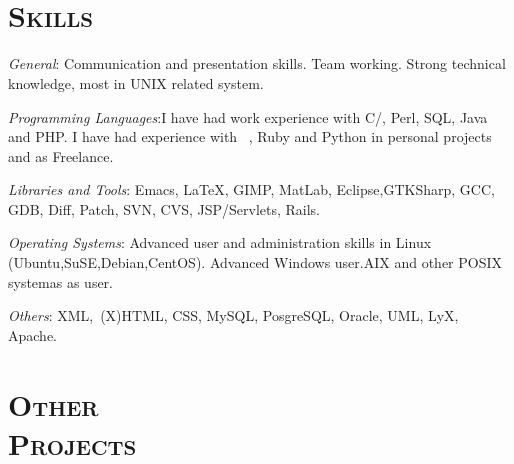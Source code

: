 \begin{resume}
 \begin{formatb}
   \\
   \body\\
 \end{formatb}



\section{\textsc{Skills}}

\emph{General}: Communication and presentation skills. Team
working. Strong technical knowledge, most in UNIX related system.

\emph{Programming Languages}:I have had work experience with
 C/\Cplusplus, Perl, SQL, Java and PHP. I have had experience with \
 \CSharp, Ruby and Python in personal projects and as Freelance.

\emph{Libraries and Tools}: Emacs, \LaTeX, GIMP, MatLab, Eclipse,GTKSharp, GCC, GDB, Diff, Patch, SVN, CVS, JSP/Servlets, Rails.

\emph{Operating Systems}: Advanced user and administration skills in
Linux (Ubuntu,SuSE,Debian,CentOS). Advanced Windows user.AIX and other
POSIX systemas as user.

\emph{Others}: XML,\ (X)HTML, CSS, MySQL, PosgreSQL, Oracle, UML, LyX, Apache.


\section{\textsc{Other\\  Projects}}


\end{resume}

